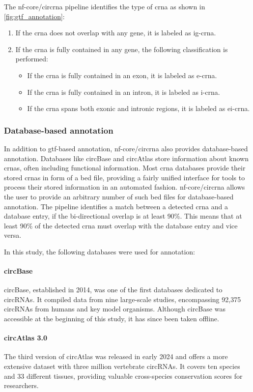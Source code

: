 The nf-core/circrna pipeline identifies the type of \gls{crna} as shown in
\cref{fig:gtf_annotation}: \begin{enumerate} \item If the \gls{crna} does not
          overlap with any gene, it is labeled as \gls{ig-crna}.
    \item If the \gls{crna} is fully contained in any gene, the following
          classification is performed:
          \begin{itemize}
              \item If the \gls{crna} is fully contained in an exon, it is
                    labeled as \gls{e-crna}.
              \item If the \gls{crna} is fully contained in an intron, it is
                    labeled as \gls{i-crna}.
              \item If the \gls{crna} spans both exonic and intronic regions,
                    it is labeled as \gls{ei-crna}.
          \end{itemize}
\end{enumerate}

\subsubsection{Database-based annotation}
In addition to \gls{gtf}-based annotation, nf-core/circrna also provides
database-based annotation.
Databases like circBase and circAtlas store information about known
\gls{crna}s, often including functional
information\supercite{glazar_circbase_2014,wu_circatlas_2023}.
Most \gls{crna} databases provide their stored \gls{crna}s in form of a
\gls{bed} file, providing a fairly unified interface for tools to process their
stored information in an automated fashion.
nf-core/circrna allows the user to provide an arbitrary number of such
\gls{bed}
files for database-based annotation.
The pipeline identifies a match between a detected \gls{crna} and a database
entry, if the bi-directional overlap is at least 90\%.
This means that at least 90\% of the detected \gls{crna} must overlap with the
database entry and vice versa.

In this study, the following databases were used for annotation:

\paragraph{circBase} circBase, established in 2014, was one of the first
databases dedicated to circRNAs.
It compiled data from nine large-scale studies, encompassing 92,375 circRNAs
from humans and key model organisms\supercite{glazar_circbase_2014}.
Although circBase was accessible at the beginning of this study, it has since
been taken offline.

\paragraph{circAtlas 3.0}
The third version of circAtlas was released in early 2024 and offers a more
extensive dataset with three million vertebrate circRNAs.
It covers ten species and 33 different tissues, providing valuable
cross-species conservation scores for researchers\supercite{wu_circatlas_2023}.
